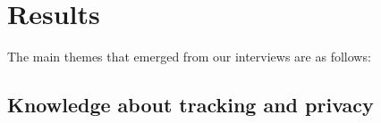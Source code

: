 \section{Results}\label{Findings}
The main themes that emerged from our interviews are as follows: 

\subsection{Knowledge about tracking and privacy}
\label{sec:findings-conv}


